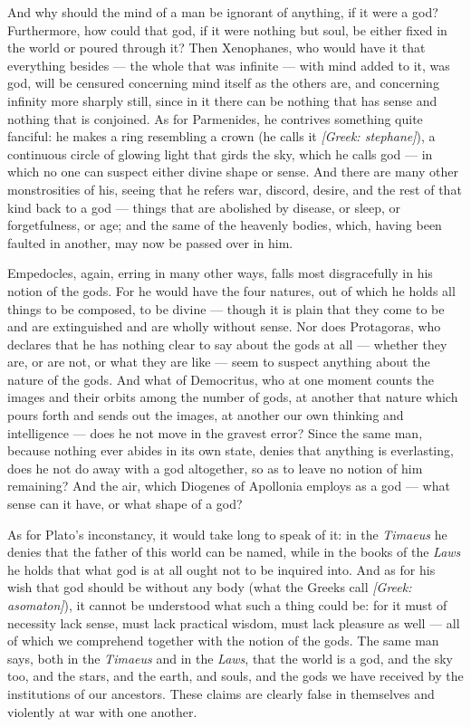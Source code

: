  And why should the mind of a man be ignorant of anything, if it were a god? Furthermore, how could that god, if it were nothing but soul, be either fixed in the world or poured through it? Then Xenophanes, who would have it that everything besides — the whole that was infinite — with mind added to it, was god, will be censured concerning mind itself as the others are, and concerning infinity more sharply still, since in it there can be nothing that has sense and nothing that is conjoined. As for Parmenides, he contrives something quite fanciful: he makes a ring resembling a crown (he calls it \textit{[Greek: stephane]}), a continuous circle of glowing light that girds the sky, which he calls god — in which no one can suspect either divine shape or sense. And there are many other monstrosities of his, seeing that he refers war, discord, desire, and the rest of that kind back to a god — things that are abolished by disease, or sleep, or forgetfulness, or age; and the same of the heavenly bodies, which, having been faulted in another, may now be passed over in him.

 Empedocles, again, erring in many other ways, falls most disgracefully in his notion of the gods. For he would have the four natures, out of which he holds all things to be composed, to be divine — though it is plain that they come to be and are extinguished and are wholly without sense. Nor does Protagoras, who declares that he has nothing clear to say about the gods at all — whether they are, or are not, or what they are like — seem to suspect anything about the nature of the gods. And what of Democritus, who at one moment counts the images and their orbits among the number of gods, at another that nature which pours forth and sends out the images, at another our own thinking and intelligence — does he not move in the gravest error? Since the same man, because nothing ever abides in its own state, denies that anything is everlasting, does he not do away with a god altogether, so as to leave no notion of him remaining? And the air, which Diogenes of Apollonia employs as a god — what sense can it have, or what shape of a god?

 As for Plato's inconstancy, it would take long to speak of it: in the \textit{Timaeus} he denies that the father of this world can be named, while in the books of the \textit{Laws} he holds that what god is at all ought not to be inquired into. And as for his wish that god should be without any body (what the Greeks call \textit{[Greek: asomaton]}), it cannot be understood what such a thing could be: for it must of necessity lack sense, must lack practical wisdom, must lack pleasure as well — all of which we comprehend together with the notion of the gods. The same man says, both in the \textit{Timaeus} and in the \textit{Laws}, that the world is a god, and the sky too, and the stars, and the earth, and souls, and the gods we have received by the institutions of our ancestors. These claims are clearly false in themselves and violently at war with one another.

